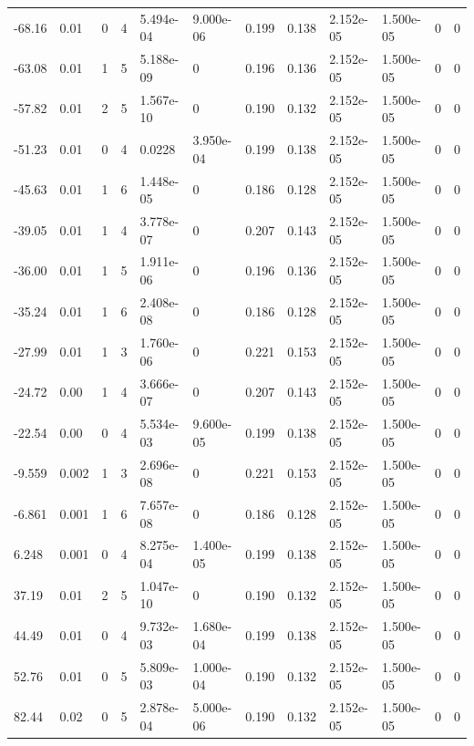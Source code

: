 \documentclass[preview]{standalone}
\begin{document}
{{\begin{tabular}{L{1.2cm}C{1.2cm} C{0.3cm}C{0.5cm} C{1.4cm}C{1.4cm} C{1.4cm}C{1.4cm} C{1.6cm}C{1.6cm} C{1.6cm}C{1.6cm}}
  -68.16  &  0.01  & 0     &  4 &  5.494e-04  & 9.000e-06  &  0.199&   0.138& 2.152e-05 & 1.500e-05   &  0 & 0  \\ 
  -63.08  &  0.01  & 1     &  5 &  5.188e-09  & 0  &  0.196&   0.136& 2.152e-05 & 1.500e-05   &  0 & 0  \\ 
  -57.82  &  0.01  & 2     &  5 &  1.567e-10  & 0  &  0.190&   0.132& 2.152e-05 & 1.500e-05   &  0 & 0  \\ 
  -51.23  &  0.01  & 0     &  4 &  0.0228  & 3.950e-04  &  0.199&   0.138& 2.152e-05 & 1.500e-05   &  0 & 0  \\ 
  -45.63  &  0.01  & 1     &  6 &  1.448e-05  & 0  &  0.186&   0.128& 2.152e-05 & 1.500e-05   &  0 & 0  \\ 
  -39.05  &  0.01  & 1     &  4 &  3.778e-07  & 0  &  0.207&   0.143& 2.152e-05 & 1.500e-05   &  0 & 0  \\ 
  -36.00  &  0.01  & 1     &  5 &  1.911e-06  & 0  &  0.196&   0.136& 2.152e-05 & 1.500e-05   &  0 & 0  \\ 
  -35.24  &  0.01  & 1     &  6 &  2.408e-08  & 0  &  0.186&   0.128& 2.152e-05 & 1.500e-05   &  0 & 0  \\ 
  -27.99  &  0.01  & 1     &  3 &  1.760e-06  & 0  &  0.221&   0.153& 2.152e-05 & 1.500e-05   &  0 & 0  \\ 
  -24.72  &  0.00  & 1     &  4 &  3.666e-07  & 0  &  0.207&   0.143& 2.152e-05 & 1.500e-05   &  0 & 0  \\ 
  -22.54  &  0.00  & 0     &  4 &  5.534e-03  & 9.600e-05  &  0.199&   0.138& 2.152e-05 & 1.500e-05   &  0 & 0  \\ 
  -9.559  &  0.002  & 1     &  3 &  2.696e-08  & 0  &  0.221&   0.153& 2.152e-05 & 1.500e-05   &  0 & 0  \\ 
  -6.861  &  0.001  & 1     &  6 &  7.657e-08  & 0  &  0.186&   0.128& 2.152e-05 & 1.500e-05   &  0 & 0  \\ 
  6.248  &  0.001  & 0     &  4 &  8.275e-04  & 1.400e-05  &  0.199&   0.138& 2.152e-05 & 1.500e-05   &  0 & 0  \\ 
  37.19  &  0.01  & 2     &  5 &  1.047e-10  & 0  &  0.190&   0.132& 2.152e-05 & 1.500e-05   &  0 & 0  \\ 
  44.49  &  0.01  & 0     &  4 &  9.732e-03  & 1.680e-04  &  0.199&   0.138& 2.152e-05 & 1.500e-05   &  0 & 0  \\ 
  52.76  &  0.01  & 0     &  5 &  5.809e-03  & 1.000e-04  &  0.190&   0.132& 2.152e-05 & 1.500e-05   &  0 & 0  \\ 
  82.44  &  0.02  & 0     &  5 &  2.878e-04  & 5.000e-06  &  0.190&   0.132& 2.152e-05 & 1.500e-05   &  0 & 0  \\ 

\end{tabular}}}
\end{document}
